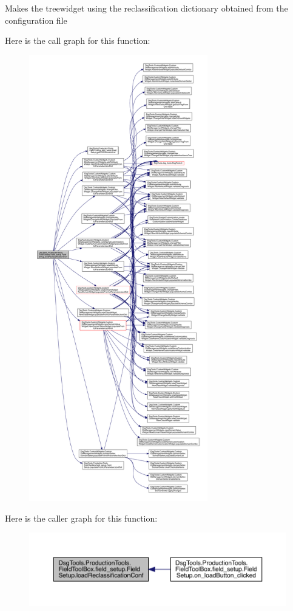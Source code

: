 \begin{DoxyVerb}Makes the treewidget using the reclassification dictionary obtained from the configuration file
\end{DoxyVerb}
 Here is the call graph for this function\+:
\nopagebreak
\begin{figure}[H]
\begin{center}
\leavevmode
\includegraphics[height=550pt]{class_dsg_tools_1_1_production_tools_1_1_field_tool_box_1_1field__setup_1_1_field_setup_aca5f44dea463a3d6404805334368dbb9_cgraph}
\end{center}
\end{figure}
Here is the caller graph for this function\+:
\nopagebreak
\begin{figure}[H]
\begin{center}
\leavevmode
\includegraphics[width=350pt]{class_dsg_tools_1_1_production_tools_1_1_field_tool_box_1_1field__setup_1_1_field_setup_aca5f44dea463a3d6404805334368dbb9_icgraph}
\end{center}
\end{figure}
